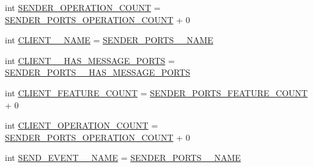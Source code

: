 \begin{DoxyCompactItemize}
\item 
int \hyperlink{interfaceshootingmachineemfmodel_1_1_shootingmachineemfmodel_package_a9ed096474c4b1ffd51eb8c38df19abfc}{S\-E\-N\-D\-E\-R\-\_\-\-O\-P\-E\-R\-A\-T\-I\-O\-N\-\_\-\-C\-O\-U\-N\-T} = \hyperlink{interfaceshootingmachineemfmodel_1_1_shootingmachineemfmodel_package_ad4c59f12e4631c8b76762f9e81227dce}{S\-E\-N\-D\-E\-R\-\_\-\-P\-O\-R\-T\-S\-\_\-\-O\-P\-E\-R\-A\-T\-I\-O\-N\-\_\-\-C\-O\-U\-N\-T} + 0
\item 
int \hyperlink{interfaceshootingmachineemfmodel_1_1_shootingmachineemfmodel_package_a327d2d5d0a52b9b329eeca590d3a2b15}{C\-L\-I\-E\-N\-T\-\_\-\-\_\-\-N\-A\-M\-E} = \hyperlink{interfaceshootingmachineemfmodel_1_1_shootingmachineemfmodel_package_a399a22f7885ad9687ceee392efd75115}{S\-E\-N\-D\-E\-R\-\_\-\-P\-O\-R\-T\-S\-\_\-\-\_\-\-N\-A\-M\-E}
\item 
int \hyperlink{interfaceshootingmachineemfmodel_1_1_shootingmachineemfmodel_package_a202487038e6af15ca1b3bb8742010a8e}{C\-L\-I\-E\-N\-T\-\_\-\-\_\-\-H\-A\-S\-\_\-\-M\-E\-S\-S\-A\-G\-E\-\_\-\-P\-O\-R\-T\-S} = \hyperlink{interfaceshootingmachineemfmodel_1_1_shootingmachineemfmodel_package_a32f9aba86ce59940c62b442308c4bf7d}{S\-E\-N\-D\-E\-R\-\_\-\-P\-O\-R\-T\-S\-\_\-\-\_\-\-H\-A\-S\-\_\-\-M\-E\-S\-S\-A\-G\-E\-\_\-\-P\-O\-R\-T\-S}
\item 
int \hyperlink{interfaceshootingmachineemfmodel_1_1_shootingmachineemfmodel_package_a88a105d8acaabeff58394a5218719930}{C\-L\-I\-E\-N\-T\-\_\-\-F\-E\-A\-T\-U\-R\-E\-\_\-\-C\-O\-U\-N\-T} = \hyperlink{interfaceshootingmachineemfmodel_1_1_shootingmachineemfmodel_package_a9db4c8b36712714f6168acc0e9fae4fa}{S\-E\-N\-D\-E\-R\-\_\-\-P\-O\-R\-T\-S\-\_\-\-F\-E\-A\-T\-U\-R\-E\-\_\-\-C\-O\-U\-N\-T} + 0
\item 
int \hyperlink{interfaceshootingmachineemfmodel_1_1_shootingmachineemfmodel_package_a291c3d883d4c792e13bacc79262dc76e}{C\-L\-I\-E\-N\-T\-\_\-\-O\-P\-E\-R\-A\-T\-I\-O\-N\-\_\-\-C\-O\-U\-N\-T} = \hyperlink{interfaceshootingmachineemfmodel_1_1_shootingmachineemfmodel_package_ad4c59f12e4631c8b76762f9e81227dce}{S\-E\-N\-D\-E\-R\-\_\-\-P\-O\-R\-T\-S\-\_\-\-O\-P\-E\-R\-A\-T\-I\-O\-N\-\_\-\-C\-O\-U\-N\-T} + 0
\item 
int \hyperlink{interfaceshootingmachineemfmodel_1_1_shootingmachineemfmodel_package_a853cae4d90f2fe3f4b43c19d24c6df5d}{S\-E\-N\-D\-\_\-\-E\-V\-E\-N\-T\-\_\-\-\_\-\-N\-A\-M\-E} = \hyperlink{interfaceshootingmachineemfmodel_1_1_shootingmachineemfmodel_package_a399a22f7885ad9687ceee392efd75115}{S\-E\-N\-D\-E\-R\-\_\-\-P\-O\-R\-T\-S\-\_\-\-\_\-\-N\-A\-M\-E}

\end{DoxyCompactItemize}
